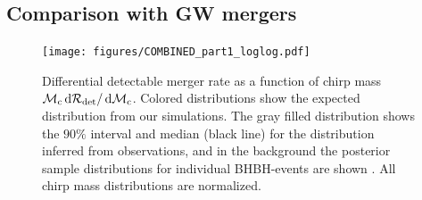 \documentclass[fleqn,usenatbib]{mnras}
\newcommand*\diff{\mathop{}\!\mathrm{d}}
\newcommand{\mchirpf}{\ensuremath{{\mathcal{M}}_{\rm{c}}}\xspace}
\begin{document}
\subsection{Comparison with GW mergers}
\label{sec:discussion-comparison-with-GW-observations}

\begin{figure}
    \centering
\texttt{[image: figures/COMBINED\_part1\_loglog.pdf]} %
\caption{Differential detectable merger rate as a function of chirp mass $ \mchirpf \diff \mathcal{R}_{\rm{det}} / \diff \mchirpf $. Colored distributions show the expected distribution from our simulations. The gray filled distribution shows the $90\%$ interval and median (black line) for the distribution inferred from observations, and in the background the posterior sample distributions for individual BHBH-events are shown \citep[][see Figure 2]{Abbott:2021GWTC3pop}.  All chirp mass distributions are normalized.  \href{https://github.com/FloorBroekgaarden/Double-Compact-Object-Mergers/blob/main/plottingCode/Detectable_Distributions_GWTC-3/COMBINED_part1_loglog.pdf}{\faFileImage} \href{https://github.com/FloorBroekgaarden/Double-Compact-Object-Mergers/blob/main/plottingCode/Detectable_Distributions_GWTC-3/GWTC-3_Fig2.ipynb}{\faBook}
}
    \label{fig:KDE-distributions-BHBH-masses-GWTC-3}
\end{figure}
\end{document}
